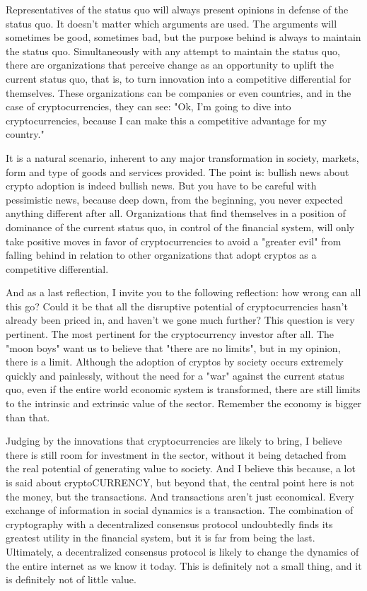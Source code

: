 Representatives of the status quo will always present opinions in defense of the status quo. It doesn't matter which arguments are used. The arguments will sometimes be good, sometimes bad, but the purpose behind is always to maintain the status quo. Simultaneously with any attempt to maintain the status quo, there are organizations that perceive change as an opportunity to uplift the current status quo, that is, to turn innovation into a competitive differential for themselves. These organizations can be companies or even countries, and in the case of cryptocurrencies, they can see: "Ok, I'm going to dive into cryptocurrencies, because I can make this a competitive advantage for my country."

It is a natural scenario, inherent to any major transformation in society, markets, form and type of goods and services provided. The point is: bullish news about crypto adoption is indeed bullish news. But you have to be careful with pessimistic news, because deep down, from the beginning, you never expected anything different after all. Organizations that find themselves in a position of dominance of the current status quo, in control of the financial system, will only take positive moves in favor of cryptocurrencies to avoid a "greater evil" from falling behind in relation to other organizations that adopt cryptos as a competitive differential.

And as a last reflection, I invite you to the following reflection: how wrong can all this go? Could it be that all the disruptive potential of cryptocurrencies hasn't already been priced in, and haven't we gone much further? This question is very pertinent. The most pertinent for the cryptocurrency investor after all. The "moon boys" want us to believe that "there are no limits", but in my opinion, there is a limit. Although the adoption of cryptos by society occurs extremely quickly and painlessly, without the need for a "war" against the current status quo, even if the entire world economic system is transformed, there are still limits to the intrinsic and extrinsic value of the sector. Remember the economy is bigger than that.

Judging by the innovations that cryptocurrencies are likely to bring, I believe there is still room for investment in the sector, without it being detached from the real potential of generating value to society. And I believe this because, a lot is said about cryptoCURRENCY, but beyond that, the central point here is not the money, but the transactions. And transactions aren't just economical. Every exchange of information in social dynamics is a transaction. The combination of cryptography with a decentralized consensus protocol undoubtedly finds its greatest utility in the financial system, but it is far from being the last. Ultimately, a decentralized consensus protocol is likely to change the dynamics of the entire internet as we know it today. This is definitely not a small thing, and it is definitely not of little value.

